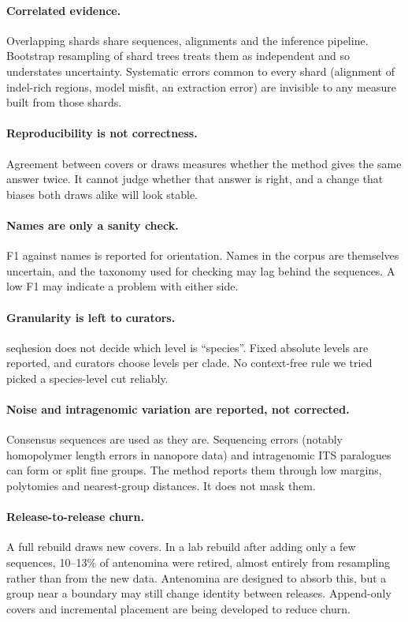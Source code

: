 \documentclass[11pt,a4paper]{article}
\newcommand{\seqhesion}{\textsf{seqhesion}}
\begin{document}
\paragraph{Correlated evidence.}
Overlapping shards share sequences, alignments and the inference pipeline. Bootstrap resampling of
shard trees treats them as independent and so understates uncertainty. Systematic errors common to
every shard (alignment of indel-rich regions, model misfit, an extraction error) are invisible to
any measure built from those shards.

\paragraph{Reproducibility is not correctness.}
Agreement between covers or draws measures whether the method gives the same answer twice. It
cannot judge whether that answer is right, and a change that biases both draws alike will look
stable.

\paragraph{Names are only a sanity check.}
F1 against names is reported for orientation. Names in the corpus are themselves uncertain, and the
taxonomy used for checking may lag behind the sequences. A low F1 may indicate a problem with either
side.

\paragraph{Granularity is left to curators.}
\seqhesion{} does not decide which level is ``species''. Fixed absolute levels are reported, and
curators choose levels per clade. No context-free rule we tried picked a species-level cut reliably.

\paragraph{Noise and intragenomic variation are reported, not corrected.}
Consensus sequences are used as they are. Sequencing errors (notably homopolymer length errors in
nanopore data) and intragenomic ITS paralogues \citep{bradshaw2023intragenomic} can form or split
fine groups. The method reports them through low margins, polytomies and nearest-group distances.
It does not mask them.

\paragraph{Release-to-release churn.}
A full rebuild draws new covers. In a lab rebuild after adding only a few sequences, 10--13\% of
antenomina were retired, almost entirely from resampling rather than from the new data. Antenomina
are designed to absorb this, but a group near a boundary may still change identity between
releases. Append-only covers and incremental placement are being developed to reduce churn.
\end{document}
